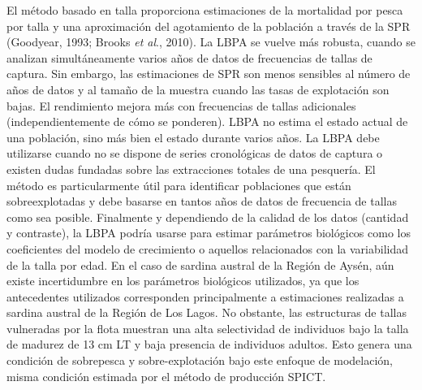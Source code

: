 \documentclass[
  spanish,
]{article}
\begin{document}
El método basado en talla proporciona estimaciones de la mortalidad por
pesca por talla y una aproximación del agotamiento de la población a
través de la SPR (Goodyear, 1993; Brooks \emph{et al}., 2010). La LBPA
se vuelve más robusta, cuando se analizan simultáneamente varios años de
datos de frecuencias de tallas de captura. Sin embargo, las estimaciones
de SPR son menos sensibles al número de años de datos y al tamaño de la
muestra cuando las tasas de explotación son bajas. El rendimiento mejora
más con frecuencias de tallas adicionales (independientemente de cómo se
ponderen). LBPA no estima el estado actual de una población, sino más
bien el estado durante varios años. La LBPA debe utilizarse cuando no se
dispone de series cronológicas de datos de captura o existen dudas
fundadas sobre las extracciones totales de una pesquería. El método es
particularmente útil para identificar poblaciones que están
sobreexplotadas y debe basarse en tantos años de datos de frecuencia de
tallas como sea posible. Finalmente y dependiendo de la calidad de los
datos (cantidad y contraste), la LBPA podría usarse para estimar
parámetros biológicos como los coeficientes del modelo de crecimiento o
aquellos relacionados con la variabilidad de la talla por edad. En el
caso de sardina austral de la Región de Aysén, aún existe incertidumbre
en los parámetros biológicos utilizados, ya que los antecedentes
utilizados corresponden principalmente a estimaciones realizadas a
sardina austral de la Región de Los Lagos. No obstante, las estructuras
de tallas vulneradas por la flota muestran una alta selectividad de
individuos bajo la talla de madurez de 13 cm LT y baja presencia de
individuos adultos. Esto genera una condición de sobrepesca y
sobre-explotación bajo este enfoque de modelación, misma condición
estimada por el método de producción SPICT.
\end{document}
